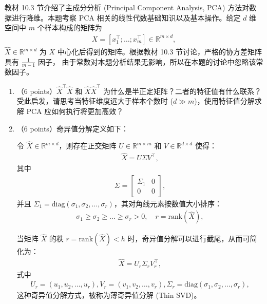 \documentclass[answers]{exam}  %
\begin{document}
\begin{questions}
教材 10.3 节介绍了主成分分析 (Principal Component Analysis, PCA) 方法对数据进行降维。本题考察 PCA 相关的线性代数基础知识以及基本操作。给定 $d$ 维空间中 $m$ 个样本构成的矩阵为
\begin{align}
X = [x_1^\top; \dots; x_m^\top] \in \mathbb{R}^{m \times d},
\end{align}
$\hat{X} \in \mathbb{R}^{m \times d}$ 为 $X$ 中心化后得到的矩阵。根据教材 10.3 节讨论，严格的协方差矩阵具有 $\frac{1}{m-1}$ 因子， 由于常数对本题分析结果无影响，所以在本题的讨论中忽略该常数因子。
\begin{enumerate}
    \item （6 points）$\hat{X}^\top \hat{X}$ 和 $\hat{X} \hat{X}^\top$ 为什么是半正定矩阵？二者的特征值有什么联系？受此启发，请思考当特征维度远大于样本个数时 ($d \gg m$)，使用特征值分解求解 PCA 应如何执行将更加高效？
    \item （6 points）奇异值分解定义如下：
    
    \vspace{\baselineskip}令 $\hat{X} \in \mathbb{R}^{m \times d}$，则存在正交矩阵 $U \in \mathbb{R}^{m \times m}$ 和 $V \in \mathbb{R}^{d \times d}$ 使得：
    \begin{align}
        \hat{X} = U \Sigma V^\top,
    \end{align}
    其中
    \begin{align}
    \Sigma = \begin{bmatrix}
    \Sigma_1 & 0 \\
    0 & 0
    \end{bmatrix},
    \end{align}
    并且 $\Sigma_1 = \text{diag}(\sigma_1, \sigma_2, \dots, \sigma_r)$，其对角线元素按数值大小排序：
    \begin{align}
        \sigma_1 \geq \sigma_2 \geq \dots \geq \sigma_r > 0, \quad r = \text{rank}(\hat{X}),
    \end{align}

    当矩阵 $\hat{X}$ 的秩 $r = \text{rank}(\hat{X}) < h$ 时，奇异值分解可以进行截尾，从而可简化为：
    \begin{align}
        \hat{X} = U_r \Sigma_r V_r^\top,
    \end{align}
    式中
    \begin{align}
        U_r = (u_1, u_2, \dots, u_r), V_r = (v_1, v_2, \dots, v_r), \Sigma_r = \text{diag}(\sigma_1, \sigma_2, \dots, \sigma_r),
    \end{align}
    这种奇异值分解方式，被称为薄奇异值分解 (Thin SVD)。
    

\end{enumerate}
\end{questions}
\end{document}
